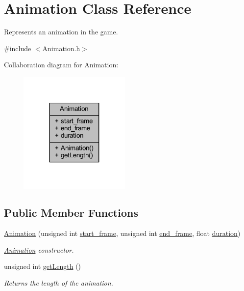 \hypertarget{class_animation}{\section{Animation Class Reference}
\label{class_animation}
}


Represents an animation in the game.  




{\ttfamily \#include $<$Animation.\+h$>$}



Collaboration diagram for Animation\+:\nopagebreak
\begin{figure}[H]
\begin{center}
\leavevmode
\includegraphics[width=155pt]{class_animation__coll__graph}
\end{center}
\end{figure}
\subsection*{Public Member Functions}
\begin{DoxyCompactItemize}
\item 
\hyperlink{class_animation_a35f74d462e717b7f65917a5259183db8}{Animation} (unsigned int \hyperlink{class_animation_a22f5936a58ca1850d5232a1cbfcb3426}{start\+\_\+frame}, unsigned int \hyperlink{class_animation_a4dcf93e9ee175acaa8cc84f3241e8ee0}{end\+\_\+frame}, float \hyperlink{class_animation_a66cc7333638f071b0401072ba95c55fd}{duration})
\begin{DoxyCompactList}\small\item\em \hyperlink{class_animation}{Animation} constructor. \end{DoxyCompactList}\item 
unsigned int \hyperlink{class_animation_ad0967bfc76be3a06a17ad774b50dc97e}{get\+Length} ()
\begin{DoxyCompactList}\small\item\em Returns the length of the animation. \end{DoxyCompactList}\end{DoxyCompactItemize}
